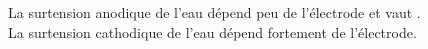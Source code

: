 ﻿\documentclass[a4paper]{article}
\begin{document}
\pagestyle{fancy}
\fancyhf{}
\setlength{\headheight}{15pt}

\begin{center}
	\large{}
\end{center}


La surtension anodique de l'eau dépend peu de l'électrode et vaut .\\
La surtension cathodique de l'eau dépend fortement de l'électrode.
\end{document}
